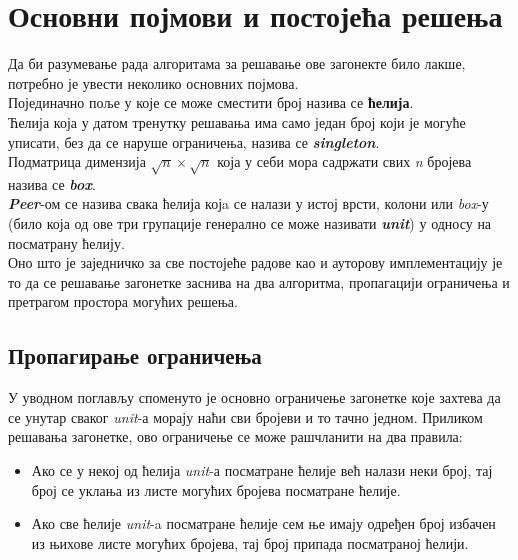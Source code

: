 \section{Основни појмови и постојећа решења}

Да би разумевање рада алгоритама за решавање ове загонекте било лакше, потребно је увести неколико основних појмова.\\

Појединачно поље у које се може сместити број назива се \textbf{ћелија}.\\

Ћелија која у датом тренутку решавања има само један број који је могуће уписати, без да се наруше ограничења, назива се \textbf{\textit{singleton}}.\\

Подматрица димензија \(\sqrt{n} \times \sqrt{n}\) која у себи мора садржати свих \textit{n} бројева назива се \textbf{\textit{box}}.\\

\textbf{\textit{Peer}}-ом се назива свака ћелија којa се налази у истој врсти, колони или \textit{box}-у (било која од ове три групације генерално се може називати \textbf{\textit{unit}}) у односу на посматрану ћелију.\\

Оно што је заједничко за све постојеће радове \cite{sudokuMulti,sudokuReport,sudokuMPI} као и ауторову имплементацију је то да се решавање загонетке заснива на два алгоритма, пропагацији ограничења и претрагом простора могућих решења.

\subsection{Пропагирање ограничења}
У уводном поглављу споменуто је основно ограничење загонетке које захтева да се унутар сваког \textit{unit}-а морају наћи сви бројеви и то тачно једном. Приликом решавања загонетке, ово ограничење се може рашчланити на два правила:
\begin{itemize}\label{rules}
    \item Ако се у некој од ћелија \textit{unit}-а посматране ћелије већ налази неки број, тај број се уклања из листе могућих бројева посматране  ћелије.
    \item Ако све ћелије \textit{unit}-a посматране ћелије сем ње имају одређен број избачен из њихове листе могућих бројева, тај број припада посматраној ћелији.
\end{itemize}

